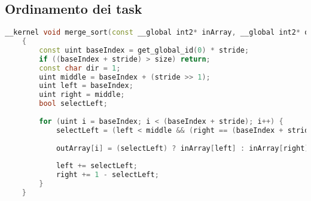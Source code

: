 \subsection{Ordinamento dei task}
\begin{lstlisting}[language=C++, caption={MergeSort kernel for metrics couple array, source: \url{https://github.com/Gram21/GPUSorting}},captionpos=b]
	__kernel void merge_sort(const __global int2* inArray, __global int2* outArray, const uint stride, const uint size)
	{
		const uint baseIndex = get_global_id(0) * stride;
		if ((baseIndex + stride) > size) return;
		const char dir = 1;
		uint middle = baseIndex + (stride >> 1);
		uint left = baseIndex;
		uint right = middle;
		bool selectLeft;
		
		for (uint i = baseIndex; i < (baseIndex + stride); i++) {
			selectLeft = (left < middle && (right == (baseIndex + stride) || lte(inArray[left], inArray[right]))) == dir;
			
			outArray[i] = (selectLeft) ? inArray[left] : inArray[right];
			
			left += selectLeft;
			right += 1 - selectLeft;
		}
	}
\end{lstlisting}

